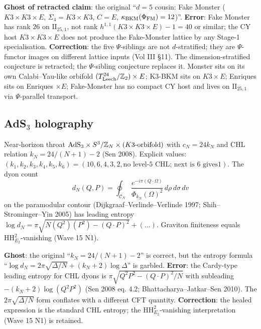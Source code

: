 \textbf{Ghost of retracted claim}: the original ``$d = 5$ cousin: Fake Monster ($K3 \times K3 \times E$, $\Sigma_4 = K3 \times K3$, $C = E$, $\kappa_{\mathrm{BKM}}(\Phi_{\mathrm{FM}}) = 12$)''. \textbf{Error}: Fake Monster has rank $26$ on $\mathrm{II}_{25, 1}$, not rank $h^{1, 1}(K3 \times K3 \times E) - 1 = 40$ or similar; the CY host $K3 \times K3 \times E$ does not produce the Fake-Monster lattice by any Stage-1 specialisation. \textbf{Correction}: the five $\Psi$-siblings are not $d$-stratified; they are $\Psi$-functor images on different lattice inputs (Vol III \S11). The dimension-stratified conjecture is retracted; the $\Psi$-sibling conjecture replaces it. Monster sits on its own Calabi--Yau-like orbifold $(T^{24}_{\mathrm{Leech}}/\mathbb{Z}_2) \times E$; K3-BKM sits on $K3 \times E$; Enriques sits on Enriques $\times E$; Fake-Monster has no compact CY host and lives on $\mathrm{II}_{25, 1}$ via $\Psi$-parallel transport.

\subsection{AdS$_3$ holography}
\label{wn:subsec:healed-AdS3}

\begin{theorem}\ClaimStatusHealed
\label{wn:thm:healed-AdS3}
Near-horizon throat $\mathrm{AdS}_3 \times S^3/\mathbb{Z}_N \times (K3\text{-orbifold})$ with $c_N = 24 k_N$ and CHL relation $k_N = 24/(N + 1) - 2$ (Sen 2008). Explicit values: $(k_1, k_2, k_3, k_4, k_5, k_6) = (10, 6, 4, 3, 2, \text{no level-5 CHL; next is } 6 \text{ gives} 1)$. The dyon count
\[
d_N(Q, P) = \oint_{\mathcal C_N} \frac{e^{-i\pi (Q \cdot \Omega)}}{\Phi_{k_N}(\Omega)^2}\, d\rho\, d\sigma\, dv
\]
on the paramodular contour (Dijkgraaf--Verlinde--Verlinde 1997; Shih--Strominger--Yin 2005) has leading entropy $\log d_N = \pi \sqrt{N(Q^2)(P^2) - (Q \cdot P)^2} + (\ldots)$. Graviton finiteness equals $\mathrm{HH}^2_{E_2}$-vanishing (Wave 15 N1).
\end{theorem}

\textbf{Ghost}: the original ``$k_N = 24/(N+1) - 2$'' is correct, but the entropy formula ``$\log d_N = 2\pi \sqrt{\Delta/N} + (k_N + 2)\log\Delta$'' is garbled. \textbf{Error}: the Cardy-type leading entropy for CHL dyons is $\pi \sqrt{Q^2 P^2 - (Q \cdot P)^2 / N}$ with subleading $-(k_N + 2) \log (Q^2 P^2)$ (Sen 2008 eq. 4.2; Bhattacharya--Jatkar--Sen 2010). The $2\pi\sqrt{\Delta/N}$ form conflates with a different CFT quantity. \textbf{Correction}: the healed expression is the standard CHL entropy; the $\mathrm{HH}^2_{E_2}$-vanishing interpretation (Wave 15 N1) is retained.

